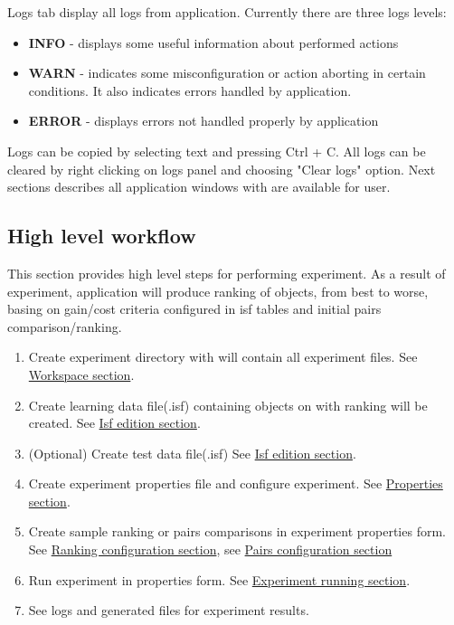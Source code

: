 Logs tab display all logs from application. 
Currently there are three logs levels:
\begin{itemize}
	\item \textbf{INFO} - displays some useful information about performed actions
	\item \textbf{WARN} - indicates some misconfiguration or action aborting in certain conditions. It also indicates errors handled by application.
	\item \textbf{ERROR} - displays errors not handled properly by application
\end{itemize}

Logs can be copied by selecting text and pressing Ctrl + C. All logs can be cleared by right clicking on logs panel and choosing "Clear logs" option.
\newline\newline
Next sections describes all application windows with are available for user.

\subsection{High level workflow}\label{sub:overview-flow}

This section provides high level steps for performing experiment. As a result of experiment, application will produce ranking of objects, from best to worse, basing on gain/cost criteria configured in isf tables and initial pairs comparison/ranking.

\begin{enumerate}
	\item Create experiment directory with will contain all experiment files.
	See \hyperref[section:workspace]{Workspace section}.
	\item Create learning data file(.isf) containing objects on with ranking will be created.
	See \hyperref[section:isf-table]{Isf edition section}.
	\item (Optional) Create test data file(.isf)
	See \hyperref[section:isf-table]{Isf edition section}.
	\item Create experiment properties file and configure experiment.
	See \hyperref[section:properties]{Properties section}.
	\item Create sample ranking or pairs comparisons in experiment properties form.
	See \hyperref[sub:properties-ranking]{Ranking configuration section},
	see \hyperref[sub:properties-pairs]{Pairs configuration section}
	\item Run experiment in properties form.
	See \hyperref[section:experiment-running]{Experiment running section}.
	\item See logs and generated files for experiment results.
\end{enumerate}

